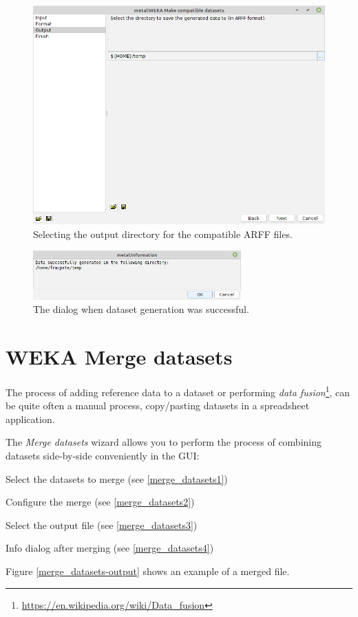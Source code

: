 \begin{figure}[htb]
  \centering
  \includegraphics[width=12.0cm]{images/makecompatible3.png}
  \caption{Selecting the output directory for the compatible ARFF files.}
  \label{makecompatible3}
\end{figure}

\begin{figure}[htb]
  \centering
  \includegraphics[width=8.0cm]{images/makecompatible4.png}
  \caption{The dialog when dataset generation was successful.}
  \label{makecompatible4}
\end{figure}

\clearpage
\section{WEKA Merge datasets}
The process of adding reference data to a dataset or performing
\textit{data fusion}\footnote{\url{https://en.wikipedia.org/wiki/Data_fusion}{}},
can be quite often a manual process, copy/pasting datasets in a spreadsheet
application.

The \textit{Merge datasets} wizard allows you to perform the
process of combining datasets side-by-side conveniently in the GUI:
\begin{tight_itemize}
  \item Select the datasets to merge (see \ref{merge_datasets1})
  \item Configure the merge (see \ref{merge_datasets2})
  \item Select the output file (see \ref{merge_datasets3})
  \item Info dialog after merging (see \ref{merge_datasets4})
\end{tight_itemize}
Figure \ref{merge_datasets-output} shows an example of a merged file.

